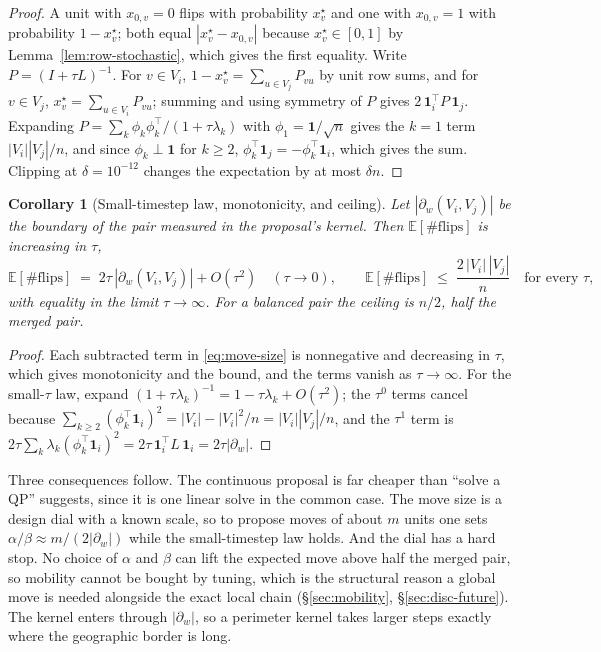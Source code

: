 \documentclass[11pt]{article}
\newtheorem{corollary}{Corollary}[section]
\newcommand{\E}{\mathbb{E}}
\begin{document}
\begin{proof}
A unit with $x_{0,v} = 0$ flips with probability $x^\star_v$ and one
with $x_{0,v} = 1$ with probability $1 - x^\star_v$; both equal
$|x^\star_v - x_{0,v}|$ because $x^\star_v \in [0,1]$ by
Lemma~\ref{lem:row-stochastic}, which gives the first equality.
Write $P = (I + \tau L)^{-1}$. For $v \in V_i$,
$1 - x^\star_v = \sum_{u \in V_j} P_{vu}$ by unit row sums, and for
$v \in V_j$, $x^\star_v = \sum_{u \in V_i} P_{vu}$; summing and using
symmetry of $P$ gives $2\,\mathbf{1}_i^{\top} P\, \mathbf{1}_j$.
Expanding $P = \sum_k \phi_k\phi_k^{\top}/(1 + \tau\lambda_k)$ with
$\phi_1 = \mathbf{1}/\sqrt{n}$ gives the $k = 1$ term
$|V_i||V_j|/n$, and since $\phi_k \perp \mathbf{1}$ for $k \ge 2$,
$\phi_k^{\top}\mathbf{1}_j = -\phi_k^{\top}\mathbf{1}_i$, which
gives the sum. Clipping at $\delta = 10^{-12}$ changes the expectation
by at most $\delta n$.
\end{proof}

\begin{corollary}[Small-timestep law, monotonicity, and ceiling]\label{cor:small-tau}
Let $|\partial_w(V_i, V_j)|$ be the boundary of the pair measured in
the proposal's kernel. Then $\E[\#\mathrm{flips}]$ is increasing in
$\tau$,
\[
  \E[\#\mathrm{flips}] \;=\; 2\tau\,|\partial_w(V_i,V_j)| + O(\tau^2)
  \quad (\tau \to 0),
  \qquad
  \E[\#\mathrm{flips}] \;\le\; \frac{2\,|V_i|\,|V_j|}{n}
  \quad\text{for every } \tau,
\]
with equality in the limit $\tau \to \infty$. For a balanced pair the
ceiling is $n/2$, half the merged pair.
\end{corollary}

\begin{proof}
Each subtracted term in \eqref{eq:move-size} is nonnegative and
decreasing in $\tau$, which gives monotonicity and the bound, and the
terms vanish as $\tau \to \infty$. For the small-$\tau$ law, expand
$(1 + \tau\lambda_k)^{-1} = 1 - \tau\lambda_k + O(\tau^2)$; the
$\tau^0$ terms cancel because
$\sum_{k \ge 2}(\phi_k^{\top}\mathbf{1}_i)^2 = |V_i| - |V_i|^2/n =
|V_i||V_j|/n$, and the $\tau^1$ term is
$2\tau\sum_k \lambda_k(\phi_k^{\top}\mathbf{1}_i)^2 =
2\tau\,\mathbf{1}_i^{\top}L\,\mathbf{1}_i = 2\tau|\partial_w|$.
\end{proof}

Three consequences follow. The continuous proposal is far cheaper
than ``solve a QP'' suggests, since it is one linear solve in the
common case. The move size is a design dial with a known scale, so to
propose moves of about $m$ units one sets
$\alpha/\beta \approx m / (2|\partial_w|)$ while the small-timestep law
holds. And the dial has a hard stop. No choice of $\alpha$ and
$\beta$ can lift the expected move above half the merged pair, so
mobility cannot be bought by tuning, which is the structural reason a
global move is needed alongside the exact local chain
(\S\ref{sec:mobility}, \S\ref{sec:disc-future}). The kernel enters
through $|\partial_w|$, so a perimeter kernel takes larger steps
exactly where the geographic border is long.
\end{document}

